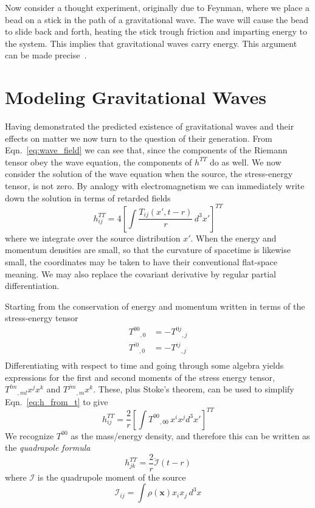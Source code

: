 Now consider a thought experiment, originally due to Feynman, where we
place a bead on a stick in the path of a gravitational wave.  The wave
will cause the bead to slide back and forth, heating the stick trough
friction and imparting energy to the system.  This implies that
gravitational waves carry energy.  This argument can be made
precise~\cite{RevModPhys.29.509}.

\section{Modeling Gravitational Waves}

Having demonstrated the predicted existence of gravitational waves and
their effects on matter we now turn to the question of their
generation.  From Eqn.~\ref{eq:wave_field} we can see that, since
the components of the Riemann tensor obey the wave equation, the
components of $h^{TT}$ do as well.  We now consider the solution of
the wave equation when the source, the stress-energy tensor, is not
zero.  By analogy with electromagnetism we can immediately write down
the solution in terms of retarded fields
%
\begin{equation}
\label{eq:h_from_t}
h^{TT}_{ij} = 4 \left[ \int \frac{T_{ij}(x', t-r)}{r}\, d^3 x'
\right]^{TT}
\end{equation}
%
where we integrate over the source distribution $x'$.  When the energy
and momentum densities are small, so that the curvature of spacetime
is likewise small, the coordinates may be taken to have their
conventional flat-space meaning.  We may also replace the covariant
derivative by regular partial differentiation.

Starting from the conservation of energy and momentum written in terms
of the stress-energy tensor
%
\begin{align*}
{T^{00}}_{,0} &= - {T^{0j}}_{,j} \\
{T^{i0}}_{,0} &= - {T^{ij}}_{,j} \\
\end{align*}
%
Differentiating with respect to time and going through some algebra
yields expressions for the first and second moments of the stress
energy tensor, ${T^{lm}}_{,ml} x^j x^k$ and ${T^{jm}}_{,m} x^k$.  These,
plus Stoke's theorem, can be used to simplify
Eqn.~\ref{eq:h_from_t} to give
%
\begin{equation*}
h^{TT}_{ij} = \frac{2}{r} \left[
\int {T^{00}}_{,00}\, x^i x^j d^3 x' \right]^{TT}
\end{equation*}
%
We recognize $T^{00}$ as the mass/energy density, and therefore this
can be written as the \emph{quadrapole formula}
%
\begin{equation}
\label{eq:quadrupole_formula}
h^{TT}_{jk} = \frac{2}{r} \ddot{\mathcal{I}}(t-r)
\end{equation}
%
where $\mathcal{I}$ is the quadrupole moment of the source
%
\begin{equation*}
\mathcal{I}_{ij} = \int \rho(\mathbf{x})x_i x_j\,d^3 x
\end{equation*}

